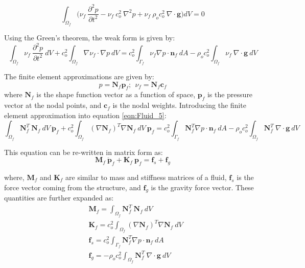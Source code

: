 \documentclass[3p]{elsarticle}
\begin{document}
\begin{equation}
    \label{eqn:Fluid_4}
    \int_{\Omega_f} \Big(\nu_f~\frac{\partial^2 p}{\partial t^2} - \nu_f~ c_o^2~\nabla^2p + \nu_f~\rho_o c_o^2~\nabla \cdot \mathbf{g}\Big) dV = 0
\end{equation}

\noindent Using the Green's theorem, the weak form is given by:
\begin{equation}
    \label{eqn:Fluid_5}
    \int_{\Omega_f} \nu_f~\frac{\partial^2 p}{\partial t^2}~dV + c_o^2 \int_{\Omega_f} \nabla \nu_f \cdot \nabla p~dV = c_o^2 \int_{\Gamma_f} \nu_f \nabla p \cdot \mathbf{n}_f~dA - \rho_o c_o^2 \int_{\Omega_f} \nu_f~\nabla \cdot \mathbf{g}~dV
\end{equation}

\noindent The finite element approximations are given by:
\begin{equation}
    \label{eqn:Fluid_6}
    p = \mathbf{N}_f \mathbf{p}_f;~~\nu_f = \mathbf{N}_f \mathbf{c}_f
\end{equation}
\noindent where $\mathbf{N}_f$ is the shape function vector as a function of space, $\mathbf{p}_f$ is the pressure vector at the nodal points, and $\mathbf{c}_f$ is the nodal weights. Introducing the finite element approximation into equation \eqref{eqn:Fluid_5}: 
\begin{equation}
    \label{eqn:Fluid_7}
    \int_{\Omega_f} \mathbf{N}_f^T~\mathbf{N}_f~dV~\mathbf{\ddot{p}}_f + c_o^2 \int_{\Omega_f} (\nabla \mathbf{N}_f)^T \nabla \mathbf{N}_f~dV~\mathbf{{p}}_f = c_o^2 \int_{\Gamma_f} \mathbf{N}_f^T \nabla p \cdot \mathbf{n}_f~dA - \rho_o c_o^2 \int_{\Omega_f} \mathbf{N}_f^T~\nabla \cdot \mathbf{g}~dV
\end{equation}

\noindent This equation can be re-written in matrix form as:
\begin{equation}
    \label{eqn:Fluid_8}
    \mathbf{M}_f~\mathbf{\ddot{p}}_f + \mathbf{K}_f~\mathbf{p}_f = \mathbf{f}_s + \mathbf{f}_g
\end{equation}

\noindent where, $\mathbf{M}_f$ and $\mathbf{K}_f$ are similar to mass and stiffness matrices of a fluid, $\mathbf{f}_s$ is the force vector coming from the structure, and $\mathbf{f}_g$ is the gravity force vector. These quantities are further expanded as:
\begin{equation}
    \label{eqn:Fluid_9}
    \begin{aligned}
    &\mathbf{M}_f = \int_{\Omega_f} \mathbf{N}_f^T~\mathbf{N}_f~dV\\
    &\mathbf{K}_f = c_o^2 \int_{\Omega_f} (\nabla \mathbf{N}_f)^T \nabla \mathbf{N}_f~dV\\
    &\mathbf{f}_s = c_o^2 \int_{\Gamma_f} \mathbf{N}_f^T \nabla p \cdot \mathbf{n}_f~dA\\
    &\mathbf{f}_g = - \rho_o c_o^2 \int_{\Omega_f} \mathbf{N}_f^T~\nabla \cdot \mathbf{g}~dV\\
    \end{aligned}
\end{equation}
\end{document}
